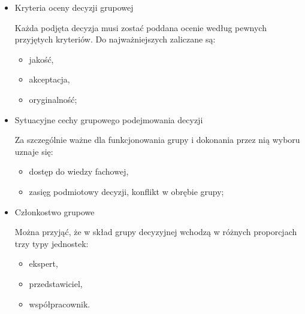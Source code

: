 \begin{itemize}
  \item Kryteria oceny decyzji grupowej
  
  Każda podjęta decyzja musi zostać poddana ocenie według pewnych przyjętych kryteriów. 
  Do najważniejszych zaliczane są:
  \begin{itemize}
    \item jakość, 
    \item akceptacja, 
    \item oryginalność;
  \end{itemize}
  
  \item Sytuacyjne cechy grupowego podejmowania decyzji
  
  Za szczególnie ważne dla funkcjonowania grupy i dokonania przez nią wyboru uznaje się:
  \begin{itemize}
    \item dostęp do wiedzy fachowej,
    \item zasięg podmiotowy decyzji,
    konflikt w obrębie grupy;
  \end{itemize}
  
  \item Członkostwo grupowe
  
  Można przyjąć, że w skład grupy decyzyjnej wchodzą w różnych proporcjach trzy typy jednostek:
  \begin{itemize}
    \item ekspert,
    \item przedstawiciel,
    \item współpracownik.
  \end{itemize}
\end{itemize}


